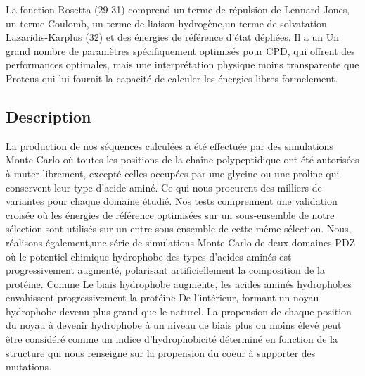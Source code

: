 La fonction Rosetta (29-31) comprend un terme de répulsion de Lennard-Jones, un terme Coulomb, un terme de liaison hydrogène,un terme de solvatation Lazaridis-Karplus (32) et des énergies de référence d'état dépliées. Il a un
Un grand nombre de paramètres spécifiquement optimisés pour CPD, qui offrent des performances optimales, mais une interprétation physique moins transparente que Proteus qui lui fournit la capacité de calculer les énergies libres formelement.

\subsection{Description}
La production de nos séquences calculées a été effectuée par des simulations Monte Carlo où toutes les positions de la chaîne polypeptidique ont été autorisées à muter librement, excepté celles occupées par une glycine ou une proline qui conservent leur type d'acide aminé. Ce qui nous procurent des milliers de variantes pour chaque domaine étudié. Nos tests comprennent une validation croisée où les énergies de référence optimisées sur un sous-ensemble de notre sélection sont utilisés sur un entre sous-ensemble de cette même sélection. Nous, réalisons également,une série de simulations Monte Carlo de deux domaines PDZ où le potentiel chimique hydrophobe des types d'acides aminés est progressivement augmenté, polarisant artificiellement la composition de la protéine. Comme Le biais hydrophobe augmente, les acides aminés hydrophobes envahissent progressivement  la protéine
De l'intérieur, formant un noyau hydrophobe devenu plus grand que le naturel.
La propension de chaque position du noyau à devenir hydrophobe à un niveau de biais plus ou moins élevé peut être considéré comme un indice d'hydrophobicité déterminé en fonction de la structure qui nous renseigne sur la propension du coeur à supporter des mutations.



